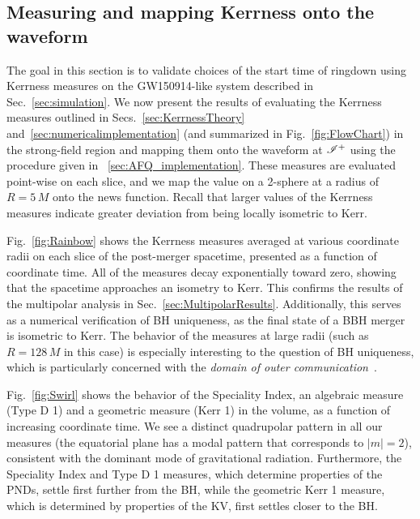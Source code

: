 \subsection{Measuring and mapping Kerrness onto the waveform}
\label{sec:PercentKerrnessmap}

 The goal in this section is to validate choices of the start time of ringdown using Kerrness measures on the GW150914-like system described in Sec.~\ref{sec:simulation}. We now present the results of evaluating the Kerrness measures outlined in Secs.~\ref{sec:KerrnessTheory} and~\ref{sec:numericalimplementation} (and summarized in Fig.~\ref{fig:FlowChart}) in the strong-field region and mapping them onto the waveform at $\mathscr{I^+}$ using the procedure given in ~\ref{sec:AFQ_implementation}. These measures are evaluated point-wise on each slice,  and we map the value on a 2-sphere at a radius of $R= 5\,M$ onto the news function. Recall that larger values of the Kerrness measures indicate greater deviation from being locally isometric to Kerr. 
 
 \RainbowFigure

Fig.~\ref{fig:Rainbow} shows the Kerrness measures averaged at various coordinate radii on each slice of the post-merger spacetime, presented as a function of coordinate time. All of the measures decay exponentially toward zero, showing that the spacetime approaches an isometry to Kerr. This confirms the results of the multipolar analysis in Sec.~\ref{sec:MultipolarResults}. Additionally, this serves as a numerical verification of BH uniqueness, as the final state of a BBH merger is isometric to Kerr. The behavior of the measures at large radii (such as $R=128\,M$ in this case) is especially interesting to the question of BH uniqueness, which is particularly concerned with the \textit{domain of outer communication}~\cite{Ionescu:2014cta}. 

Fig.~\ref{fig:Swirl} shows the behavior of the Speciality Index, an algebraic measure (Type D 1) and a geometric measure (Kerr 1) in the volume, as a function of increasing coordinate time. We see a distinct quadrupolar pattern in all our measures (the equatorial plane has a modal pattern that corresponds to $|m| = 2$), consistent with the dominant mode of gravitational radiation. Furthermore, the Speciality Index  and Type D 1 measures, which determine properties of the PNDs, settle first further from the BH, while the geometric Kerr 1 measure, which is determined by properties of the KV, first settles closer to the BH. 

